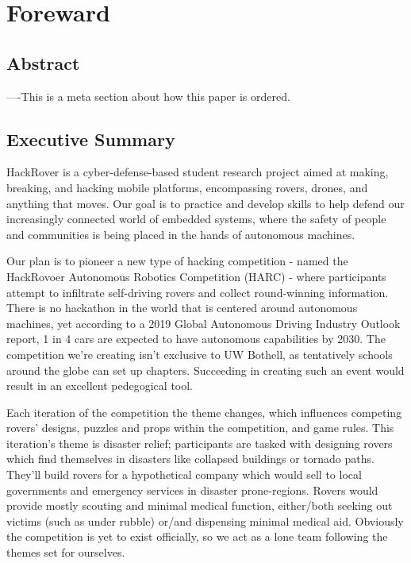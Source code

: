 \documentclass[a4paper, 10pt]{article}
\begin{document}
\begin{titlepage}
\end{titlepage}

\pagebreak{}

\tableofcontents

\pagebreak{}

\section*{Foreward}
	\subsection*{Abstract}
	----This is a meta section about how this paper is ordered.	
	
	\subsection*{Executive Summary}
	HackRover is a cyber-defense-based student research project aimed at making, breaking, and hacking mobile platforms, encompassing rovers, drones, and anything that moves. Our goal is to practice and develop skills to help defend our increasingly connected world of embedded systems, where the safety of people and communities is being placed in the hands of autonomous machines.
	
	Our plan is to pioneer a new type of hacking competition - named the HackRovoer Autonomous Robotics Competition (HARC) - where participants attempt to infiltrate self-driving rovers and collect round-winning information. There is no hackathon in the world that is centered around autonomous machines, yet according to a 2019 Global Autonomous Driving Industry Outlook report, 1 in 4 cars are expected to have autonomous capabilities by 2030. The competition we're creating isn't exclusive to UW Bothell, as tentatively schools around the globe can set up chapters. Succeeding in creating such an event would result in an excellent pedegogical tool. 
	
	Each iteration of the competition the theme changes, which influences competing rovers' designs, puzzles and props within the competition, and game rules. This iteration's theme is disaster relief; participants are tasked with designing rovers which find themselves in disasters like collapsed buildings or tornado paths. They'll build rovers for a hypothetical company which would sell to local governments and emergency services in disaster prone-regions. Rovers would provide mostly scouting and minimal medical function, either/both seeking out victims (such as under rubble) or/and dispensing minimal medical aid. Obviously the competition is yet to exist officially, so we act as a lone team following the themes set for ourselves. 
	
\end{document}
